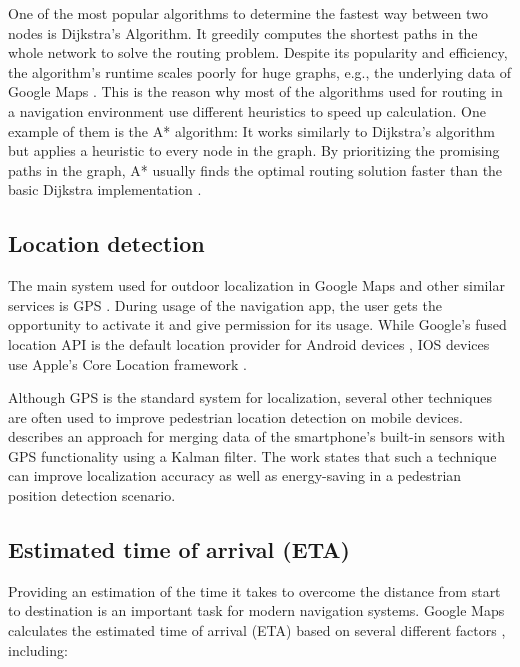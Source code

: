 One of the most popular algorithms to determine the fastest way between two nodes is Dijkstra's Algorithm. It greedily computes the shortest paths in the whole network to solve the routing problem. Despite its popularity and efficiency, the algorithm's runtime scales poorly for huge graphs, e.g., the underlying data of Google Maps \cite{google_maps}. This is the reason why most of the algorithms used for routing in a navigation environment use different heuristics to speed up calculation. One example of them is the A* algorithm: It works similarly to Dijkstra's algorithm but applies a heuristic to every node in the graph. By prioritizing the promising paths in the graph, A* usually finds the optimal routing solution faster than the basic Dijkstra implementation \cite{google_maps}.


\subsection{Location detection}
The main system used for outdoor localization in Google Maps and other similar services is GPS \cite{google_maps}. During usage of the navigation app, the user gets the opportunity to activate it and give permission for its usage. While Google's fused location API is the default location provider for Android devices \cite{fused_location_api}, IOS devices use Apple's Core Location framework \cite{core_location_framework}.

Although GPS is the standard system for localization, several other techniques are often used to improve pedestrian location detection on mobile devices. \cite{localization_techniques} describes an approach for merging data of the smartphone's built-in sensors with GPS functionality using a Kalman filter. The work states that such a technique can improve localization accuracy as well as energy-saving in a pedestrian position detection scenario.

\subsection{Estimated time of arrival (ETA)}
Providing an estimation of the time it takes to overcome the distance from start to destination is an important task for modern navigation systems. Google Maps calculates the estimated time of arrival (ETA) based on several different factors \cite{google_maps}, including:

